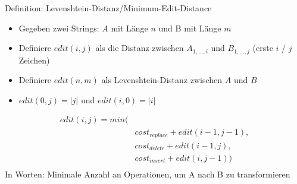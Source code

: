 \documentclass[aspectratio=169]{beamer}
\begin{document}
\begin{frame}{Definition: Levenshtein-Distanz/Minimum-Edit-Distance}
\begin{itemize}
    \item Gegeben zwei Strings: $A$ mit Länge $n$ und B mit Länge $m$ \pause
    \item Definiere $edit(i,j)$ als die Distanz zwischen $A_{1,\dots,i}$ und $B_{1,\dots,j}$ (erste $i$ / $j$ Zeichen)
    \item Definiere $edit(n,m)$ als Levenshtein-Distanz zwischen $A$ und $B$
    \pause
    \item $edit(0,j)=|j|$ und $edit(i,0)=|i|$
    \end{itemize}
    \pause

    \begin{equation}
        \begin{aligned}
        edit(i,j)=min( & \\
        & cost_{replace} + edit(i-1,j-1), \\
        & cost_{delete}+ edit(i-1,j), \\
        &  cost_{insert}+ edit(i,j-1)) \\
        \end{aligned}
    \end{equation}
    \pause
     In Worten: Minimale Anzahl an Operationen, um A nach B zu transformieren

\end{frame}


\end{document}

